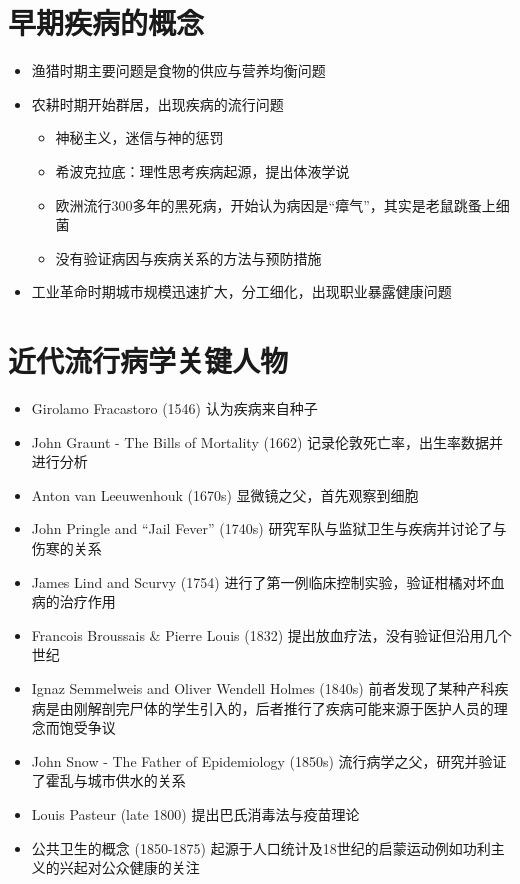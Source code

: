\documentclass[]{book}
\providecommand{\tightlist}{%
  \setlength{\itemsep}{0pt}\setlength{\parskip}{0pt}}
\begin{document}
\hypertarget{ux65e9ux671fux75beux75c5ux7684ux6982ux5ff5}{%
\section{早期疾病的概念}\label{ux65e9ux671fux75beux75c5ux7684ux6982ux5ff5}}

\begin{itemize}
\tightlist
\item
  渔猎时期主要问题是食物的供应与营养均衡问题
\item
  农耕时期开始群居，出现疾病的流行问题

  \begin{itemize}
  \tightlist
  \item
    神秘主义，迷信与神的惩罚
  \item
    希波克拉底：理性思考疾病起源，提出体液学说
  \item
    欧洲流行300多年的黑死病，开始认为病因是``瘴气''，其实是老鼠跳蚤上细菌
  \item
    没有验证病因与疾病关系的方法与预防措施
  \end{itemize}
\item
  工业革命时期城市规模迅速扩大，分工细化，出现职业暴露健康问题
\end{itemize}

\hypertarget{ux8fd1ux4ee3ux6d41ux884cux75c5ux5b66ux5173ux952eux4ebaux7269}{%
\section{近代流行病学关键人物}\label{ux8fd1ux4ee3ux6d41ux884cux75c5ux5b66ux5173ux952eux4ebaux7269}}

\begin{itemize}
\tightlist
\item
  Girolamo Fracastoro (1546) 认为疾病来自种子
\item
  John Graunt - The Bills of Mortality (1662) 记录伦敦死亡率，出生率数据并进行分析
\item
  Anton van Leeuwenhouk (1670s) 显微镜之父，首先观察到细胞
\item
  John Pringle and ``Jail Fever'' (1740s) 研究军队与监狱卫生与疾病并讨论了与伤寒的关系
\item
  James Lind and Scurvy (1754) 进行了第一例临床控制实验，验证柑橘对坏血病的治疗作用
\item
  Francois Broussais \& Pierre Louis (1832) 提出放血疗法，没有验证但沿用几个世纪
\item
  Ignaz Semmelweis and Oliver Wendell Holmes (1840s) 前者发现了某种产科疾病是由刚解剖完尸体的学生引入的，后者推行了疾病可能来源于医护人员的理念而饱受争议
\item
  John Snow - The Father of Epidemiology (1850s) 流行病学之父，研究并验证了霍乱与城市供水的关系
\item
  Louis Pasteur (late 1800) 提出巴氏消毒法与疫苗理论
\item
  公共卫生的概念 (1850-1875) 起源于人口统计及18世纪的启蒙运动例如功利主义的兴起对公众健康的关注
\end{itemize}
\end{document}
